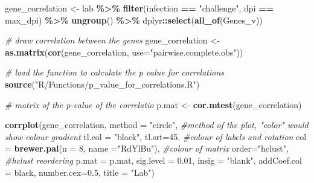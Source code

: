 \documentclass[
]{article}
\newenvironment{Shaded}{\begin{snugshade}}{\end{snugshade}}
\newcommand{\AttributeTok}[1]{\textcolor[rgb]{0.13,0.29,0.53}{#1}}
\newcommand{\CommentTok}[1]{\textcolor[rgb]{0.56,0.35,0.01}{\textit{#1}}}
\newcommand{\DecValTok}[1]{\textcolor[rgb]{0.00,0.00,0.81}{#1}}
\newcommand{\FloatTok}[1]{\textcolor[rgb]{0.00,0.00,0.81}{#1}}
\newcommand{\FunctionTok}[1]{\textcolor[rgb]{0.13,0.29,0.53}{\textbf{#1}}}
\newcommand{\NormalTok}[1]{#1}
\newcommand{\OtherTok}[1]{\textcolor[rgb]{0.56,0.35,0.01}{#1}}
\newcommand{\SpecialCharTok}[1]{\textcolor[rgb]{0.81,0.36,0.00}{\textbf{#1}}}
\newcommand{\StringTok}[1]{\textcolor[rgb]{0.31,0.60,0.02}{#1}}
\begin{document}
\begin{Shaded}
\begin{Highlighting}[]
\NormalTok{gene\_correlation }\OtherTok{\textless{}{-}}\NormalTok{ lab }\SpecialCharTok{\%\textgreater{}\%} 
  \FunctionTok{filter}\NormalTok{(infection }\SpecialCharTok{==} \StringTok{"challenge"}\NormalTok{, dpi }\SpecialCharTok{==}\NormalTok{ max\_dpi) }\SpecialCharTok{\%\textgreater{}\%}
  \FunctionTok{ungroup}\NormalTok{() }\SpecialCharTok{\%\textgreater{}\%}
\NormalTok{  dplyr}\SpecialCharTok{::}\FunctionTok{select}\NormalTok{(}\FunctionTok{all\_of}\NormalTok{(Genes\_v))}

\CommentTok{\# draw correlation between the genes}
\NormalTok{gene\_correlation }\OtherTok{\textless{}{-}} \FunctionTok{as.matrix}\NormalTok{(}\FunctionTok{cor}\NormalTok{(gene\_correlation, }
                                  \AttributeTok{use=}\StringTok{"pairwise.complete.obs"}\NormalTok{))}

\CommentTok{\# load the function to calculate the p value for correlations}
\FunctionTok{source}\NormalTok{(}\StringTok{"R/Functions/p\_value\_for\_correlations.R"}\NormalTok{)}

\CommentTok{\# matrix of the p{-}value of the correlatio}
\NormalTok{p.mat }\OtherTok{\textless{}{-}} \FunctionTok{cor.mtest}\NormalTok{(gene\_correlation)}

\FunctionTok{corrplot}\NormalTok{(gene\_correlation, }
         \AttributeTok{method =} \StringTok{"circle"}\NormalTok{,  }\CommentTok{\#method of the plot, "color" would show colour gradient}
         \AttributeTok{tl.col =} \StringTok{"black"}\NormalTok{, }\AttributeTok{tl.srt=}\DecValTok{45}\NormalTok{, }\CommentTok{\#colour of labels and rotation}
         \AttributeTok{col =} \FunctionTok{brewer.pal}\NormalTok{(}\AttributeTok{n =} \DecValTok{8}\NormalTok{, }\AttributeTok{name =}\StringTok{"RdYlBu"}\NormalTok{), }\CommentTok{\#colour of matrix}
         \AttributeTok{order=}\StringTok{"hclust"}\NormalTok{, }\CommentTok{\#hclust reordering}
         \AttributeTok{p.mat =}\NormalTok{ p.mat, }\AttributeTok{sig.level =} \FloatTok{0.01}\NormalTok{, }\AttributeTok{insig =} \StringTok{"blank"}\NormalTok{,}
         \AttributeTok{addCoef.col =} \StringTok{\textquotesingle{}black\textquotesingle{}}\NormalTok{,}
         \AttributeTok{number.cex=}\FloatTok{0.5}\NormalTok{, }
         \AttributeTok{title =} \StringTok{"Lab"}\NormalTok{) }
\end{Highlighting}
\end{Shaded}
\end{document}
